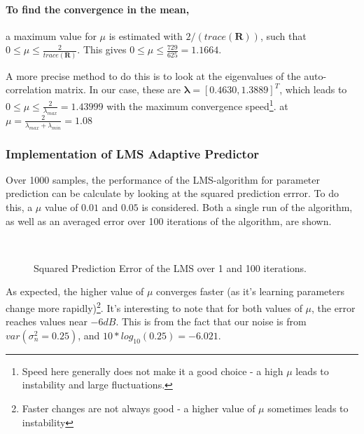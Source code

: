 \documentclass[main.tex]{subfiles}
\begin{document}
\paragraph{To find the convergence in the mean,} a maximum value for $\mu$ is estimated with $2/(trace(\textbf{R}))$, such that $0 \leq \mu \leq \frac{2}{trace(\textbf{R})}$. This gives $0 \leq \mu \leq \frac{729}{625} = 1.1664$.

A more precise method to do this is to look at the eigenvalues of the auto-correlation matrix. In our case, these are $\mathbf{ \lambda } = [0.4630, 1.3889] ^ T $, which leads to $0 \leq \mu \leq \frac{2}{\lambda_{max}} = 1.43999$ with the maximum convergence speed\footnote{Speed here generally does not make it a good choice - a high $\mu$ leads to instability and large fluctuations.}.  at $\mu = \frac{2}{\lambda_{max} + \lambda_{min}} = 1.08$






\subsubsection{Implementation of LMS Adaptive Predictor}

Over 1000 samples, the performance of the LMS-algorithm for parameter prediction can be calculate by looking at the squared prediction errror. To do this, a $\mu$ value of $0.01$ and $0.05$ is considered. Both a single run of the algorithm, as well as an averaged error over 100 iterations of the algorithm, are shown.


\begin{figure}[H]
	\centering
	\begin{subfigure}[b]{0.45\textwidth}
		\resizebox{\textwidth}{!}{}
	\end{subfigure}%
	~ %
	\begin{subfigure}[b]{0.45\textwidth}
		\resizebox{\textwidth}{!}{}
	\end{subfigure}
	\caption{Squared Prediction Error of the LMS over 1 and 100 iterations.}
	\label{fig:1-1-b}
\end{figure}



As expected, the higher value of $\mu$ converges faster (as it's learning parameters change more rapidly)\footnote{Faster changes are not always good - a higher value of $\mu$ sometimes leads to instability}. It's interesting to note that for both values of $\mu$, the error reaches values near $-6dB$. This is from the fact that our noise is from $var(\sigma_n^2 = 0.25)$, and $10*log_{10}(0.25) = -6.021$.
\end{document}
